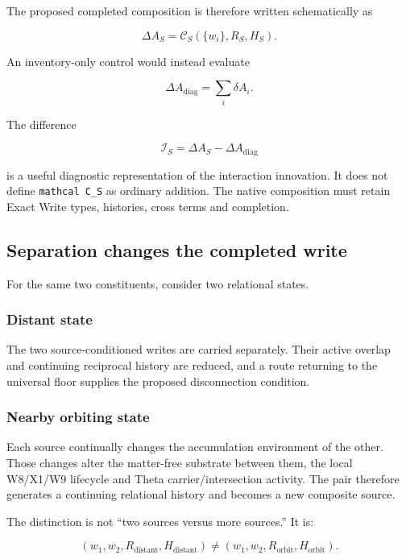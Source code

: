 The proposed completed composition is therefore written schematically as

\[
\Delta A_S
=
\mathcal C_S\!\left(\{w_i\},R_S,H_S\right).
\]

An inventory-only control would instead evaluate

\[
\Delta A_{\mathrm{diag}}=\sum_i\delta A_i.
\]

The difference

\[
\mathcal I_S
=
\Delta A_S-\Delta A_{\mathrm{diag}}
\]

is a useful diagnostic representation of the interaction innovation. It
does not define \texttt{mathcal\ C\_S} as ordinary addition. The native
composition must retain Exact Write types, histories, cross terms and
completion.

\subsection{Separation changes the completed
write}\label{viii-ch12-separation-changes-the-completed-write}

For the same two constituents, consider two relational states.

\subsubsection{Distant state}\label{viii-ch12-distant-state}

The two source-conditioned writes are carried separately. Their active
overlap and continuing reciprocal history are reduced, and a route
returning to the universal floor supplies the proposed disconnection
condition.

\subsubsection{Nearby orbiting state}\label{viii-ch12-nearby-orbiting-state}

Each source continually changes the accumulation environment of the
other. Those changes alter the matter-free substrate between them, the
local W8/X1/W9 lifecycle and Theta carrier/intersection activity. The
pair therefore generates a continuing relational history and becomes a
new composite source.

The distinction is not ``two sources versus more sources.'' It is:

\[
(w_1,w_2,R_{\mathrm{distant}},H_{\mathrm{distant}})
\neq
(w_1,w_2,R_{\mathrm{orbit}},H_{\mathrm{orbit}}).
\]


